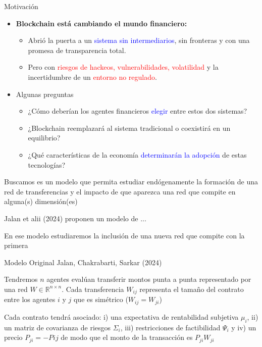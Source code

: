 \documentclass{beamer}
\begin{document}
\begin{frame}{Motivación}
\begin{itemize}
   \item \textbf{Blockchain está cambiando el mundo financiero:}
   \begin{itemize}
       \item Abrió la puerta a un \textcolor{blue}{sistema sin intermediarios}, sin fronteras y con una promesa de transparencia total.
       \item Pero con \textcolor{red}{riesgos de hackeos, vulnerabilidades, volatilidad} y la incertidumbre de un \textcolor{red}{entorno no regulado}.
   \end{itemize}
   
   \vspace{0.5cm}
   \item Algunas preguntas
   \begin{itemize}
  \item ¿Cómo deberían los agentes financieros \textcolor{blue}{elegir} entre estos dos sistemas?
     \vspace{0.3cm}
   \item ¿Blockchain reemplazará al sistema tradicional o coexistirá en un equilibrio?
   
   
   \vspace{0.3cm}
   
   \item ¿Qué características de la economía \textcolor{blue}{determinarán la adopción} de estas tecnologías?
   \end{itemize}
\end{itemize}
\end{frame}

\begin{frame}

Buscamos es un modelo que permita estudiar endógenamente la formación de una red de transferencias y el impacto de que aparezca una red que compite en alguna(s) dimensión(es)

Jalan et alii (2024) proponen un modelo de ...

En ese modelo estudiaremos la inclusión de una nueva red que compite con la primera

\end{frame}

\begin{frame}{Modelo Original Jalan, Chakrabarti, Sarkar (2024)}

Tendremos $n$ agentes evalúan transferir montos punta a punta representado por una red $W\in\mathbb{R}^{n\times n}$. Cada transferencia $W_{ij}$ representa el tamaño del contrato entre los agentes $i$ y $j$ que es simétrico ($W_{ij}=W_{ji}$) 

Cada contrato tendrá asociado: i) una expectativa de rentabilidad subjetiva $\mu_i$, ii) un matriz de covarianza de riesgos $\Sigma_i$, iii) restricciones de factibilidad $\Psi_i$ y iv) un precio $P_{ji}=-P{ij}$ de modo que el monto de la transacción es $P_{ji}W_{ji}$

\end{frame}
\end{document}
